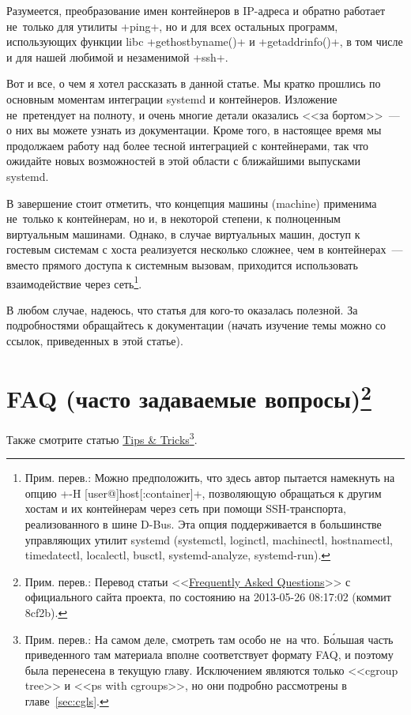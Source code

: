 \documentclass[10pt,oneside,a4paper]{article}
\newcommand{\sfnote}[1]{\texorpdfstring{\protect\footnote%
	{Прим. перев.: #1}}{}}
\begin{document}
Разумеется, преобразование имен контейнеров в IP-адреса и обратно работает
не~только для утилиты +ping+, но и для всех остальных программ, использующих
функции libc +gethostbyname()+ и +getaddrinfo()+, в том числе и для нашей
любимой и незаменимой +ssh+.

Вот и все, о чем я хотел рассказать в данной статье. Мы кратко прошлись по
основным моментам интеграции systemd и контейнеров. Изложение не~претендует на
полноту, и очень многие детали оказались <<за бортом>>~--- о них вы можете
узнать из документации. Кроме того, в настоящее время мы продолжаем работу над
более тесной интеграцией с контейнерами, так что ожидайте новых возможностей в
этой области с ближайшими выпусками systemd.

В завершение стоит отметить, что концепция машины (machine) применима не~только
к контейнерам, но и, в некоторой степени, к полноценным виртуальным машинами.
Однако, в случае виртуальных машин, доступ к гостевым системам с хоста
реализуется несколько сложнее, чем в контейнерах~--- вместо прямого доступа к
системным вызовам, приходится использовать взаимодействие через
сеть\footnote{Прим. перев.: Можно предположить, что здесь автор пытается
намекнуть на опцию +-H [user@]host[:container]+, позволяющую обращаться к
другим хостам и их контейнерам через сеть при помощи SSH-транспорта,
реализованного в шине D-Bus. Эта опция поддерживается в большинстве управляющих
утилит systemd (systemctl, loginctl, machinectl, hostnamectl, timedatectl,
localectl, busctl, systemd-analyze, systemd-run).}.

В любом случае, надеюсь, что статья для кого-то оказалась полезной. За
подробностями обращайтесь к документации (начать изучение темы можно со ссылок,
приведенных в этой статье).

\appendix

\section{FAQ (часто задаваемые вопросы)\sfnote{Перевод статьи
<<\href{http://www.freedesktop.org/wiki/Software/systemd/FrequentlyAskedQuestions}%
{Frequently Asked Questions}>> с официального сайта проекта, по состоянию на
2013-05-26 08:17:02 (коммит 8cf2b).}}

Также смотрите статью
\href{http://www.freedesktop.org/wiki/Software/systemd/TipsAndTricks}{Tips \&
Tricks}\footnote{Прим. перев.: На самом деле, смотреть там особо не~на что.
Б\'{о}льшая часть приведенного там материала вполне соответствует формату FAQ, и
поэтому была перенесена в текущую главу. Исключением являются только
<<cgroup tree>> и <<ps with cgroups>>, но они подробно рассмотрены в
главе~\ref{sec:cgls}.}.
\end{document}

